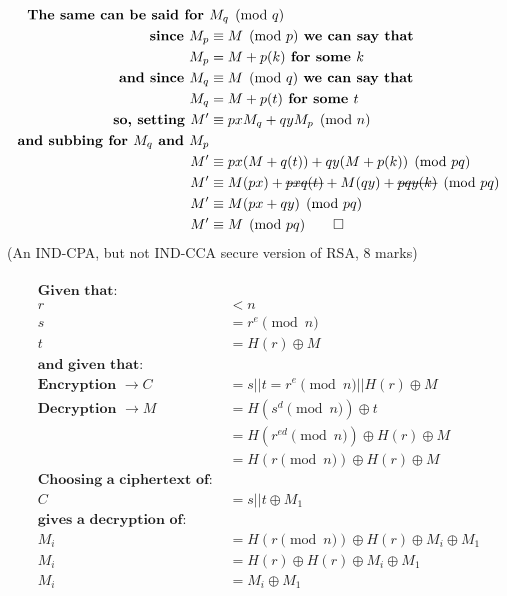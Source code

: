 \documentclass{assignment}
\begin{document}
\begin{flushleft}
\begin{problemlist}
\begin{align*}
\textbf{ The same can be said for }&M_q \pmod{q}\\
\textbf{since } M_p &\equiv M \pmod{p} \textbf{ we can say that }\\
 M_p &= M + p(k) \textbf{ for some } k\\
 \textbf{and since } M_q &\equiv M \pmod{q} \textbf{ we can say that }\\
 M_q &= M + p(t) \textbf{ for some } t\\ 
\textbf{so, setting } M' &\equiv pxM_q + qyM_p \pmod{n}\\
\textbf{and subbing for }M_q \textbf{ and } M_p\\
M' &\equiv px(M +q(t)) + qy(M + p(k)) \pmod{pq}\\
M' &\equiv M(px) + \text{\sout{$pxq(t)$}} + M(qy) + \text{\sout{$pqy(k)$}} \pmod{pq}\\
M' &\equiv M(px + qy) \pmod{pq}\\
M' &\equiv M \pmod{pq}\qed\
\end{align*}
\newpage
\pbitem (An IND-CPA, but not IND-CCA secure version of RSA, 8 marks)\hspace{1cm}\\
\hspace{1cm}\\
\begin{align*}
\textbf{Given that: }\\
r &< n\\
s &= r^e \pmod{n}\\
t &= H(r) \oplus M\\
\textbf{and given that: }\\
\textbf{Encryption } \rightarrow C &= s||t = r^e \pmod{n} || H(r) \oplus M\\
\textbf{Decryption } \rightarrow M &= H( s^d \pmod{n}) \oplus t\\
&= H( r^{ed}\pmod{n}) \oplus H(r) \oplus M\\
&= H( r\pmod{n}) \oplus H(r) \oplus M\\
\textbf{Choosing a ciphertext of: }\\
C &= s||t \oplus M_1\\
\textbf{gives a decryption of: }\\
M_i &= H( r \pmod{n} ) \oplus H(r) \oplus M_i \oplus M_1\\
M_i &= H(r) \oplus H(r) \oplus M_i \oplus M_1\\
M_i &= M_i \oplus M_1\\

\end{align*}
\end{problemlist}
\end{flushleft}
\end{document}
